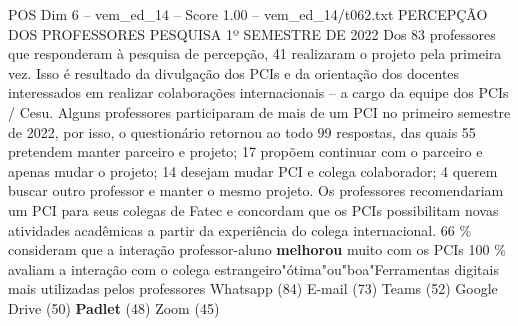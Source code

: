 \begin{textsample}{POS Dim 6 – vem\_ed\_14 – Score 1.00 – vem\_ed\_14/t062.txt}  \label{ex:f6_pos_089}
PERCEPÇÃO DOS PROFESSORES PESQUISA 1º SEMESTRE DE 2022 Dos 83 professores que responderam à pesquisa de percepção, 41 realizaram o projeto pela primeira vez.
Isso é resultado da divulgação dos PCIs e da orientação dos docentes interessados em realizar colaborações internacionais – a cargo da equipe dos PCIs / Cesu.
Alguns professores participaram de mais de um PCI no primeiro semestre de 2022, por isso, o questionário retornou ao todo 99 respostas, das quais 55 pretendem manter parceiro e projeto; 17 propõem continuar com o parceiro e apenas mudar o projeto; 14 desejam mudar PCI e colega colaborador; 4 querem buscar outro professor e manter o mesmo projeto.
Os professores recomendariam um PCI para seus colegas de Fatec e concordam que os PCIs possibilitam novas atividades acadêmicas a partir da experiência do colega internacional. 66 \% consideram que a interação professor-aluno \textbf{melhorou} muito com os PCIs 100 \% avaliam a interação com o colega estrangeiro"ótima"ou"boa"Ferramentas digitais mais utilizadas pelos professores Whatsapp (84) E-mail (73) Teams (52) Google Drive (50) \textbf{Padlet} (48) Zoom (45)

\end{textsample}
